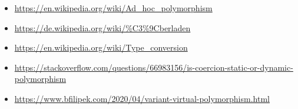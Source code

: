 \begin{itemize}
	\item \url{https://en.wikipedia.org/wiki/Ad_hoc_polymorphism}
	\item \url{https://de.wikipedia.org/wiki/\%C3\%9Cberladen}
	\item \url{https://en.wikipedia.org/wiki/Type_conversion}
	\item \url{https://stackoverflow.com/questions/66983156/is-coercion-static-or-dynamic-polymorphism}
	
	\item \url{https://www.bfilipek.com/2020/04/variant-virtual-polymorphism.html}
\end{itemize}
